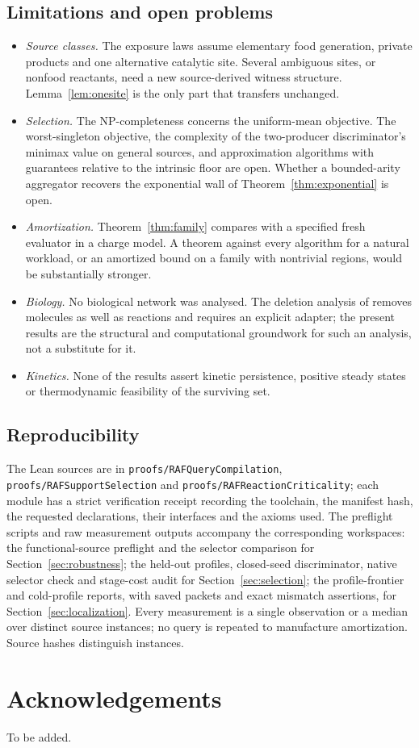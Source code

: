 \documentclass[11pt,a4paper]{article}
\theoremstyle{plain}
\theoremstyle{definition}
\theoremstyle{remark}
\newcommand{\lean}[1]{\texttt{#1}}
\begin{document}
\subsection{Limitations and open problems}

\begin{itemize}
\item \emph{Source classes.} The exposure laws assume elementary food generation, private products and one alternative catalytic site. Several ambiguous sites, or nonfood reactants, need a new source-derived witness structure. Lemma~\ref{lem:onesite} is the only part that transfers unchanged.
\item \emph{Selection.} The NP-completeness concerns the uniform-mean objective. The worst-singleton objective, the complexity of the two-producer discriminator's minimax value on general sources, and approximation algorithms with guarantees relative to the intrinsic floor are open. Whether a bounded-arity aggregator recovers the exponential wall of Theorem~\ref{thm:exponential} is open.
\item \emph{Amortization.} Theorem~\ref{thm:family} compares with a specified fresh evaluator in a charge model. A theorem against every algorithm for a natural workload, or an amortized bound on a family with nontrivial regions, would be substantially stronger.
\item \emph{Biology.} No biological network was analysed. The deletion analysis of \citep{sousa2015} removes molecules as well as reactions and requires an explicit adapter; the present results are the structural and computational groundwork for such an analysis, not a substitute for it.
\item \emph{Kinetics.} None of the results assert kinetic persistence, positive steady states or thermodynamic feasibility of the surviving set.
\end{itemize}

\subsection{Reproducibility}

The Lean sources are in \lean{proofs/RAFQueryCompilation}, \lean{proofs/RAFSupportSelection} and \lean{proofs/RAFReactionCriticality}; each module has a strict verification receipt recording the toolchain, the manifest hash, the requested declarations, their interfaces and the axioms used. The preflight scripts and raw measurement outputs accompany the corresponding workspaces: the functional-source preflight and the selector comparison for Section~\ref{sec:robustness}; the held-out profiles, closed-seed discriminator, native selector check and stage-cost audit for Section~\ref{sec:selection}; the profile-frontier and cold-profile reports, with saved packets and exact mismatch assertions, for Section~\ref{sec:localization}. Every measurement is a single observation or a median over distinct source instances; no query is repeated to manufacture amortization. Source hashes distinguish instances.

\section*{Acknowledgements}
To be added.



\end{document}
